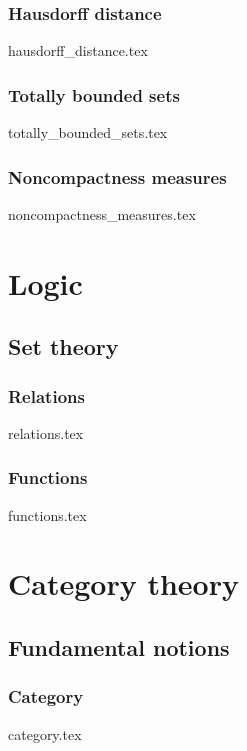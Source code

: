 \documentclass[numbers=endperiod, bibliography=totocnumbered]{scrartcl}
\begin{document}
\subsubsection{Hausdorff distance}\label{sec:hausdorff_distance}
{hausdorff_distance.tex}
\subsubsection{Totally bounded sets}\label{sec:totally_bounded_sets}
{totally_bounded_sets.tex}
\subsubsection{Noncompactness measures}\label{sec:noncompactness_measures}
{noncompactness_measures.tex}

\section{Logic}\label{sec:logic}
\subsection{Set theory}\label{sec:sets}
\subsubsection{Relations}\label{sec:relations}
{relations.tex}
\subsubsection{Functions}\label{sec:functions}
{functions.tex}

\section{Category theory}\label{sec:category_theory}
\subsection{Fundamental notions}\label{sec:category_theory/fundamental_notions}
\subsubsection{Category}\label{sec:category}
{category.tex}


\printbibliography
\end{document}
